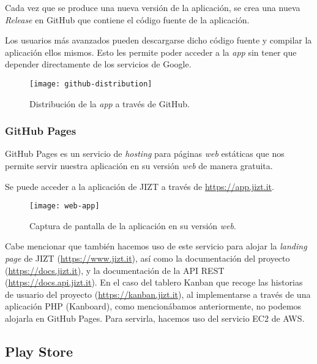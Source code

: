 Cada vez que se produce una nueva versión de la aplicación, se crea una nueva \emph{Release} en GitHub que contiene el código fuente de la aplicación.

Los usuarios más avanzados pueden descargarse dicho código fuente y compilar la aplicación ellos mismos. Esto les permite poder acceder a la \emph{app} sin tener que depender directamente de los servicios de Google.

\begin{figure}[h]
	\centering
	\texttt{[image: github-distribution]}
	\caption[Distribución de la \emph{app} a través de GitHub.]{Distribución de la \emph{app} a través de GitHub.}
\end{figure}

\newpage

\subsubsection{GitHub Pages}

GitHub Pages es un servicio de \emph{hosting} para páginas \emph{web} estáticas que nos permite servir nuestra aplicación en su versión \emph{web} de manera gratuita.

Se puede acceder a la aplicación de JIZT a través de \href{https://app.jizt.it}{https://app.jizt.it}.


\begin{figure}[h]
	\centering
	\texttt{[image: web-app]}
	\caption{Captura de pantalla de la aplicación en su versión \emph{web}.}
\end{figure}

Cabe mencionar que también hacemos uso de este servicio para alojar la \emph{landing page} de JIZT (\href{https://www.jizt.it}{https://www.jizt.it}), así como la documentación del proyecto (\href{https://docs.jizt.it}{https://docs.jizt.it}), y la documentación de la API REST (\href{https://docs.api.jizt.it}{https://docs.api.jizt.it}). En el caso del tablero Kanban que recoge las historias de usuario del proyecto (\href{https://board.jizt.it/public/board/c08ea3322e2876652a0581e79d6430e2dc0c27720d8a06d7853e84c3cd2b}{https://kanban.jizt.it}), al implementarse a través de una aplicación PHP (Kanboard), como mencionábamos anteriormente, no podemos alojarla en GitHub Pages. Para servirla, hacemos uso del servicio EC2 de AWS.

\subsection{Play Store}

